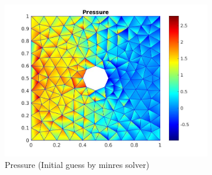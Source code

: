 \documentclass[a4paper]{book}
\begin{document}
\begin{figure}
\begin{subfigure}{\textwidth}
  \includegraphics[width=\linewidth]{cylinder_newton_pressure_minres.jpg}
  \caption{Pressure (Initial guess by minres solver)}
  \label{pressure_navier_stoke_minres}
\end{subfigure}
\caption{\label{flow_over_cylinder_minres_n_s}}
\end{figure}
\end{document}
